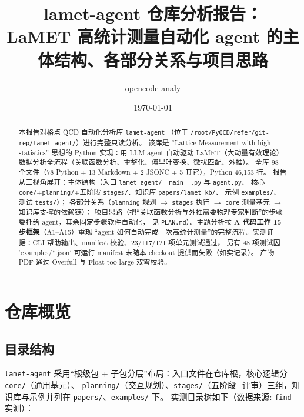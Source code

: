 \documentclass[UTF8]{ctexart}
\title{\textbf{lamet-agent 仓库分析报告：\\ LaMET 高统计测量自动化 agent 的主体结构、各部分关系与项目思路}}
\author{opencode analy}
\date{\today}
\begin{document}
\maketitle

\begin{abstract}
本报告对格点 QCD 自动化分析库 \texttt{lamet-agent}
（位于 \texttt{/root/PyQCD/refer/git-rep/lamet-agent/}）进行完整只读分析。
该库是 ``Lattice Measurement with high statistics'' 思想的 Python 实现：用 LLM agent 自动驱动
LaMET（大动量有效理论）数据分析全流程（关联函数分析、重整化、傅里叶变换、微扰匹配、外推）。
全库 98 个文件（78 Python + 13 Markdown + 2 JSONC + 5 其它），Python 46{,}153 行。
报告从三视角展开：\textcolor{struct}{主体结构}（入口 \texttt{lamet\_agent/\_\_main\_\_.py} 与 \texttt{agent.py}、
核心 \texttt{core/}+\texttt{planning/}+五阶段 \texttt{stages/}、知识库 \texttt{papers/lamet\_kb/}、
示例 \texttt{examples/}、测试 \texttt{tests/}）；
\textcolor{relation}{各部分关系}（\texttt{planning} 规划 $\to$ \texttt{stages} 执行 $\to$ \texttt{core} 测量基元 $\to$ 知识库支撑的依赖链）；
\textcolor{idea}{项目思路}（把“关联函数分析与外推需要物理专家判断”的步骤委托给 agent，其余固定步骤软件自动化，
见 \texttt{PLAN.md}）。主题分析按 \textbf{A 代码工作 15 步框架}（A1--A15）重现
“agent 如何自动完成一次高统计测量”的完整流程。实测证据：CLI 帮助输出、manifest 校验、23/117/121 项单元测试通过，
另有 48 项测试因 `examples/*.json` 可运行 manifest 未随本 checkout 提供而失败（如实记录）。
产物 PDF 通过 Overfull 与 Float too large 双零校验。
\end{abstract}

\tableofcontents

\section{仓库概览}

\subsection{目录结构}

\texttt{lamet-agent} 采用“根级包 + 子包分层”布局：入口文件在仓库根，核心逻辑分 \texttt{core/}（通用基元）、
\texttt{planning/}（交互规划）、\texttt{stages/}（五阶段+评审）三组，知识库与示例并列在 \texttt{papers/}、\texttt{examples/} 下。
实测目录树如下（数据来源: \texttt{find} 实测）：
\end{document}
